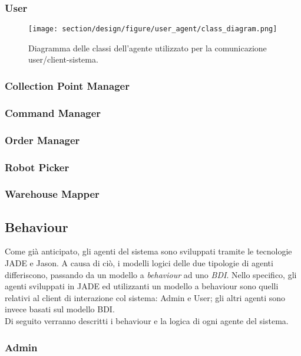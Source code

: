 \subsubsection{User}
\begin{figure}[ht]
    \texttt{[image: section/design/figure/user\_agent/class\_diagram.png]}
    \caption{Diagramma delle classi dell'agente utilizzato per la comunicazione user/client-sistema.}
    \label{fig:class_diagram_user_agent}
\end{figure}
\subsubsection{Collection Point Manager}
\subsubsection{Command Manager}
\subsubsection{Order Manager}
\subsubsection{Robot Picker}
\subsubsection{Warehouse Mapper}

\subsection{Behaviour}


Come già anticipato, gli agenti del sistema sono sviluppati tramite le tecnologie JADE e Jason. A causa di ciò, i modelli logici delle due tipologie di agenti differiscono, passando da un modello a \textit{behaviour} ad uno \textit{BDI}. Nello specifico, gli agenti sviluppati in JADE ed utilizzanti un modello a behaviour sono quelli relativi al client di interazione col sistema: Admin e User; gli altri agenti sono invece basati sul modello BDI.\\
Di seguito verranno descritti i behaviour e la logica di ogni agente del sistema.

\subsubsection{Admin}
